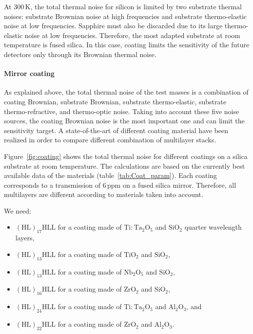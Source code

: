 At 300\,K, the total thermal noise for silicon is limited by two substrate thermal noises: substrate Brownian noise at high frequencies and substrate thermo-elastic noise at low frequencies. Sapphire must also be discarded due to its large thermo-elastic noise at low frequencies. Therefore, the most adapted substrate at room temperature is fused silica. In this case, coating limits the sensitivity of the future detectors only through its Brownian thermal noise. 

\paragraph{Mirror coating}

As explained above, the total thermal noise of the test masses is a combination of coating Brownian, substrate Brownian, substrate thermo-elastic, substrate thermo-refractive, and thermo-optic noise. Taking into account these five noise sources, the coating Brownian noise is the most important one and can limit the sensitivity target. A state-of-the-art of different coating material have been realized in order to compare different combination of multilayer stacks.  

Figure~\ref{fig:coating} shows the total thermal noise for different coatings on a silica substrate at room temperature. The calculations are based on the currently best available data of the materials (table~\ref{tab:Coat_param}). Each coating corresponds to a transmission of 6\,ppm on a fused silica mirror. Therefore, all multilayers are different according to materials taken into account.

We need:

\begin{itemize}
	\item $\mathrm{(HL)_{17}HLL}$ for a coating made of $\mathrm{Ti:Ta_2O_5}$ and $\mathrm{SiO_2}$ quarter wavelength layers,
	\item $\mathrm{(HL)_{13}HLL}$ for a coating made of $\mathrm{TiO_2}$ and $\mathrm{SiO_2}$,
	\item $\mathrm{(HL)_{13}HLL}$ for a coating made of $\mathrm{Nb_2O_5}$ and $\mathrm{SiO_2}$,
	\item $\mathrm{(HL)_{16}HLL}$ for a coating made of $\mathrm{ZrO_2}$ and $\mathrm{SiO_2}$,
	\item $\mathrm{(HL)_{24}HLL}$ for a coating made of $\mathrm{Ti:Ta_2O_5}$ and $\mathrm{Al_2O_3}$, and
	\item $\mathrm{(HL)_{22}HLL}$ for a coating made of $\mathrm{ZrO_2}$ and $\mathrm{Al_2O_3}$.
\end{itemize}

